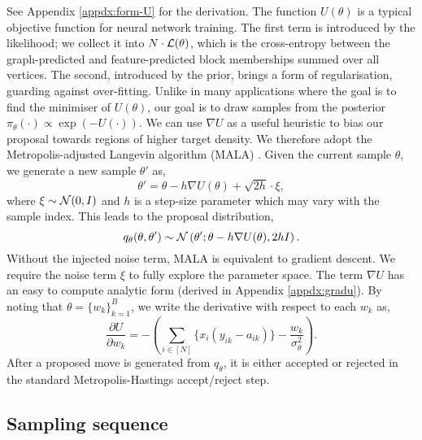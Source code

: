 See Appendix \ref{appdx:form-U} for the derivation. The function $U(\theta)$ is a typical objective function for neural network training. The first term is introduced by the likelihood; we collect it into $N \cdot \mathcal{L}(\theta)$, which is the cross-entropy between the graph-predicted and feature-predicted block memberships summed over all vertices. 
The second, introduced by the prior, brings a form of regularisation, guarding against over-fitting. Unlike in many applications where the goal 
is to find the minimiser of $U(\theta)$, our goal is to draw samples from the posterior $\pi_\theta(\cdot) \propto \exp(-U(\cdot))$. We can use $\nabla U$ as a useful heuristic to bias our proposal towards regions of higher target density. We therefore adopt the Metropolis-adjusted Langevin algorithm (MALA) \cite{mala-tweedie}. Given the current sample $\theta$, we generate 
a new sample $\theta'$ as,
%
\begin{equation*}
	\theta' = \theta - h \nabla U(\theta) + \sqrt{2h} \cdot \xi,
\end{equation*}
%
where $\xi \sim \mathcal{N}(0, I)$ and $h$ is a step-size parameter 
which may vary with the sample index.
This leads to the proposal distribution,
\begin{equation*}
	q_\theta(\theta, \theta') \sim \mathcal{N} \left( \theta' ; \theta - h \nabla U(\theta), 2h I \right).
\end{equation*}
%
Without the injected noise term, MALA is equivalent to gradient descent. We require the noise term $\xi$ to fully explore the parameter space. 
The term $\nabla U$ has an easy to compute analytic form (derived in Appendix \ref{appdx:gradu}). By noting that $\theta = \{w_k\}_{k=1}^{B}$, we write the derivative with respect to each $w_k$ as,
%
\begin{equation}
	\frac{\partial U}{\partial w_k} = - \left( \sum_{i \in [N]} \Big\{ x_i (y_{ik} - a_{ik}) \Big\} - \frac{w_k}{\sigma_\theta^2} \right).
	\label{eqn:U-derivative}
\end{equation}
%
After a proposed move is generated from $q_\theta$,
it is either accepted or rejected in the standard
Metropolis-Hastings accept/reject step.

\subsection{Sampling sequence}
\label{s:ss}

